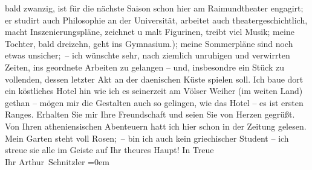 \begin{ledgroupsized}[t]{13cm}
               bald zwanzig, ist für die nächste Saison schon hier am Raimundtheater engagirt; er studirt auch Philosophie an der Universität, arbeitet auch
               theatergeschichtlich, macht Inszenierungspläne, zeichnet u malt Figurinen, treibt
               viel Musik; meine Tochter,
               bald dreizehn, geht ins Gymnasium.); meine Sommer{\pb}pläne sind noch etwas unsicher; – ich wünschte sehr, nach ziemlich unruhigen und
               verwirrten Zeiten, ins geordnete Arbeiten zu gelangen – und, insbesondre ein Stück zu vollenden, dessen
               letzter Akt an der daenischen Küste spielen
               soll. Ich baue dort ein köstliches Hotel hin wie ich es seinerzeit am Völser Weiher (im weiten Land) gethan – mögen mir die Gestalten auch so gelingen, wie das
               Hotel – es ist ersten Ranges.\pend
           \pstart
           Erhalten Sie mir Ihre Freundschaft und seien Sie von Herzen gegrüßt.\pend
           \pstart
           Von Ihren atheniensischen Abenteuern hatt ich
               hier schon in der Zeitung gelesen. Mein Garten steht voll Rosen; – bin ich auch kein
                  griechischer Student – ich streue sie alle
               im Geiste auf Ihr theures Haupt!\pend
           \pstart
           In Treue{\\[\baselineskip]}Ihr \spacefill\mbox{Arthur Schnitzler}\pend
           \leftskip=0em{}
         
         \endnumbering{}\end{ledgroupsized}  \newcommand{\dateiname}{L02387}\newcommand{\titel}{Arthur Schnitzler an Georg Brandes, 7. 6. 1922}\newcommand{\editorInnen}{Martin Anton Müller und Gerd-Hermann Susen}
      